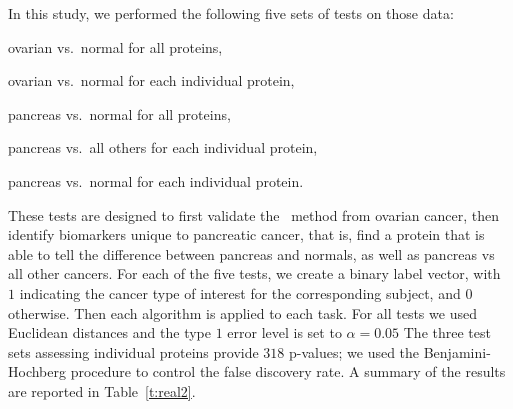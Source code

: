 \documentclass[11pt]{extarticle}
\begin{document}
In this study, we performed the following five sets of tests on those data:
\begin{compactenum}
\item  ovarian vs.~normal for all proteins,
\item ovarian vs.~normal for each individual protein,
\item  pancreas vs.~normal for all proteins,
\item  pancreas vs.~all others for each individual protein,
\item pancreas vs.~normal for each individual protein.
\end{compactenum}
%
These tests are designed to first validate the \Mgc~method from ovarian cancer, then identify biomarkers unique to pancreatic cancer, that is, find a protein that is able to tell the difference between pancreas and normals, as well as pancreas vs all other cancers.
%
For each of the five tests, we create a binary label vector, with $1$ indicating the cancer type of interest for the corresponding subject, and $0$ otherwise. Then each algorithm is applied to each task.
For all tests we used Euclidean distances and the type $1$ error level is set to $\alpha=0.05$
The three test sets assessing individual proteins provide $318$ p-values; we used
the Benjamini-Hochberg procedure \cite{Benjamini1995}  to control the false discovery rate. A summary of the results are reported in Table~\ref{t:real2}.
\end{document}
